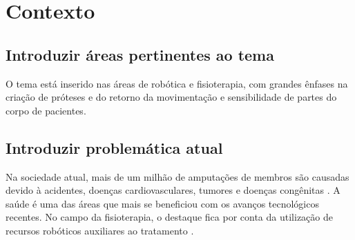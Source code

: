 \documentclass[12pt,a4paper]{article}
\begin{document}
    \section{Contexto}
    \subsection{Introduzir áreas pertinentes ao tema}
    O tema está inserido nas áreas de robótica e fisioterapia, com grandes ênfases na criação de próteses e do retorno da movimentação e sensibilidade de partes do corpo de pacientes.

    \subsection{Introduzir problemática atual}
    Na sociedade atual, mais de um milhão de amputações de membros são causadas devido à acidentes, doenças cardiovasculares, tumores e doenças congênitas \cite{5}.
    A saúde é uma das áreas que mais se beneficiou com os avanços tecnológicos recentes. No campo da fisioterapia, o destaque fica por conta da utilização de recursos robóticos auxiliares ao tratamento \cite{1}.
\end{document}

